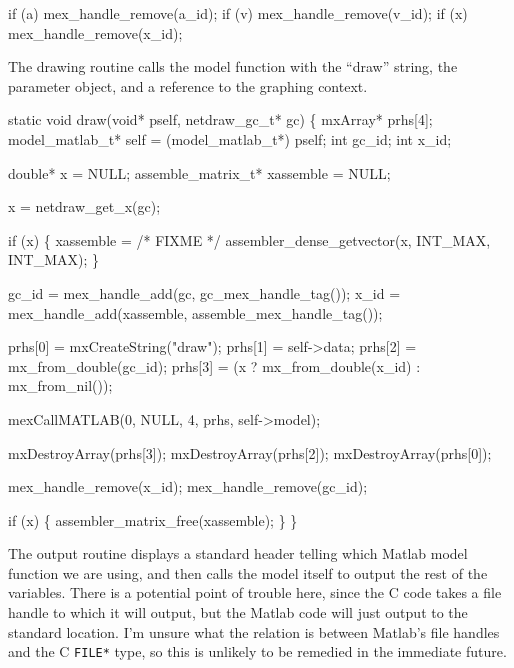 \nwenddocs{}\endmoddef
if (a) mex_handle_remove(a_id);
if (v) mex_handle_remove(v_id);
if (x) mex_handle_remove(x_id);
\nwendcode{}\nwdocspar


The drawing routine calls the model function with the ``draw''
string, the parameter object, and a reference to the graphing
context.

\nwenddocs{}\plusendmoddef
static void draw(void* pself, netdraw_gc_t* gc)
\{
    mxArray* prhs[4];
    model_matlab_t* self = (model_matlab_t*) pself;
    int gc_id;
    int x_id;

    double* x = NULL;
    assemble_matrix_t* xassemble = NULL;

    x = netdraw_get_x(gc);

    if (x) \{
        xassemble = /* FIXME */
            assembler_dense_getvector(x, INT_MAX, INT_MAX);
    \}

    gc_id = mex_handle_add(gc, gc_mex_handle_tag());
    x_id  = mex_handle_add(xassemble, assemble_mex_handle_tag());

    prhs[0] = mxCreateString("draw");
    prhs[1] = self->data;
    prhs[2] = mx_from_double(gc_id);
    prhs[3] = (x ? mx_from_double(x_id) : mx_from_nil());

    mexCallMATLAB(0, NULL, 4, prhs, self->model); 

    mxDestroyArray(prhs[3]);
    mxDestroyArray(prhs[2]);
    mxDestroyArray(prhs[0]);

    mex_handle_remove(x_id);
    mex_handle_remove(gc_id);

    if (x) \{
        assembler_matrix_free(xassemble);
    \}
\}

\nwendcode{}\nwdocspar

The output routine displays a standard header telling which Matlab
model function we are using, and then calls the model itself
to output the rest of the variables.  There is a potential point
of trouble here, since the C code takes a file handle to which it
will output, but the Matlab code will just output to the standard
location.  I'm unsure what the relation is between Matlab's file
handles and the C {\tt{}FILE*} type, so this is unlikely to be
remedied in the immediate future.

